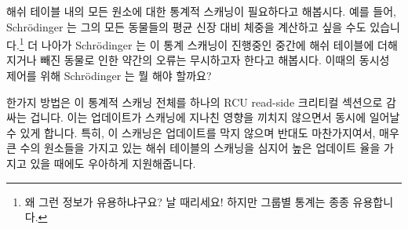 해쉬 테이블 내의 모든 원소에 대한 통계적 스캐닝이 필요하다고 해봅시다.
예를 들어, Schr\"odinger 는 그의 모든 동물들의 평균 신장 대비 체중을 계산하고
싶을 수도 있습니다.\footnote{
	왜 그런 정보가 유용하냐구요?
	날 때리세요!
	하지만 그룹별 통계는 종종 유용합니다.}
더 나아가 Schr\"odinger 는 이 통계 스캐닝이 진행중인 중간에 해쉬 테이블에
더해지거나 빼진 동물로 인한 약간의 오류는 무시하고자 한다고 해봅시다.
이때의 동시성 제어를 위해 Schr\"odinger 는 뭘 해야 할까요?

한가지 방법은 이 통계적 스캐닝 전체를 하나의 RCU read-side 크리티컬 섹션으로
감싸는 겁니다.
이는 업데이트가 스캐닝에 지나친 영향을 끼치지 않으면서 동시에 일어날 수 있게
합니다.
특히, 이 스캐닝은 업데이트를 막지 않으며 반대도 마찬가지여서, 매우 큰 수의
원소들을 가지고 있는 해쉬 테이블의 스캐닝을 심지어 높은 업데이트 율을 가지고
있을 때에도 우아하게 지원해줍니다.

\iffalse

Suppose that a statistical scan of all elements in a hash table is
required.
For example, Schr\"odinger might wish to compute the average
length-to-weight ratio over all of his animals.\footnote{
	Why would such a quantity be useful?
	Beats me!
	But group statistics are often useful.}
Suppose further that Schr\"odinger is willing to ignore slight
errors due to animals being added to and removed from the hash
table while this statistical scan is being carried out.
What should Schr\"odinger do to control concurrency?

One approach is to enclose the statistical scan in an RCU read-side
critical section.
This permits updates to proceed concurrently without unduly impeding
the scan.
In particular, the scan does not block the updates and vice versa,
which allows scan of hash tables containing very large numbers of
elements to be supported gracefully, even in the face of very high
update rates.

\fi

